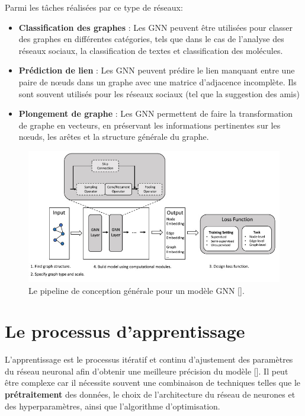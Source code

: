 \medskip
Parmi les tâches réalisées par ce type de réseaux:
\begin{itemize}
	\item \textbf{Classification des graphes} : Les GNN peuvent être utilisées pour classer des graphes en différentes catégories, tels que dans le cas de l'analyse des réseaux sociaux, la classification de textes et classification des molécules.
	\item \textbf{Prédiction de lien} : Les GNN peuvent prédire le lien manquant entre une paire de nœuds dans un graphe avec une matrice d'adjacence incomplète. Ils sont souvent utilisés pour les réseaux sociaux (tel que la suggestion des amis)
	\item \textbf{Plongement de graphe} : Les GNN permettent de faire la transformation de graphe en vecteurs, en préservant les informations pertinentes sur les nœuds, les arêtes et la structure générale du graphe.
\end{itemize}

\begin{figure}[hbt!]
	\centering
	\includegraphics[width=15cm]{images_pfe/gnn.jpg}
	\caption{Le pipeline de conception générale pour un modèle GNN [\cite{ZHOU202057}].}
	\label{fig:gnn}
\end{figure}
\FloatBarrier
\medskip

\section{Le processus d’apprentissage}
L’apprentissage est le processus itératif et continu d’ajustement des
paramètres du réseau neuronal afin d’obtenir une meilleure précision du modèle
[\cite{Goodfellow-et-al-2016}]. Il peut être complexe car il nécessite souvent
une combinaison de techniques telles que le \textbf{prétraitement} des données,
le choix de l'architecture du réseau de neurones et des hyperparamètres, ainsi
que l'algorithme d'optimisation.

